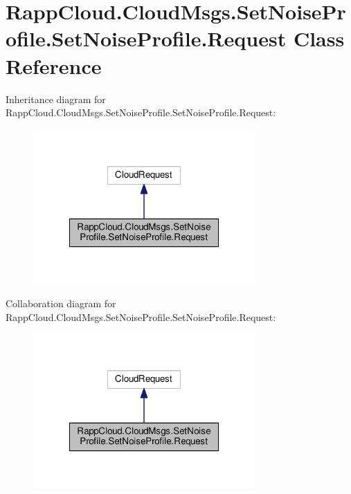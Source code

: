\hypertarget{classRappCloud_1_1CloudMsgs_1_1SetNoiseProfile_1_1SetNoiseProfile_1_1Request}{\section{Rapp\-Cloud.\-Cloud\-Msgs.\-Set\-Noise\-Profile.\-Set\-Noise\-Profile.\-Request Class Reference}
\label{classRappCloud_1_1CloudMsgs_1_1SetNoiseProfile_1_1SetNoiseProfile_1_1Request}
}


Inheritance diagram for Rapp\-Cloud.\-Cloud\-Msgs.\-Set\-Noise\-Profile.\-Set\-Noise\-Profile.\-Request\-:
\nopagebreak
\begin{figure}[H]
\begin{center}
\leavevmode
\includegraphics[width=240pt]{classRappCloud_1_1CloudMsgs_1_1SetNoiseProfile_1_1SetNoiseProfile_1_1Request__inherit__graph}
\end{center}
\end{figure}


Collaboration diagram for Rapp\-Cloud.\-Cloud\-Msgs.\-Set\-Noise\-Profile.\-Set\-Noise\-Profile.\-Request\-:
\nopagebreak
\begin{figure}[H]
\begin{center}
\leavevmode
\includegraphics[width=240pt]{classRappCloud_1_1CloudMsgs_1_1SetNoiseProfile_1_1SetNoiseProfile_1_1Request__coll__graph}
\end{center}
\end{figure}
